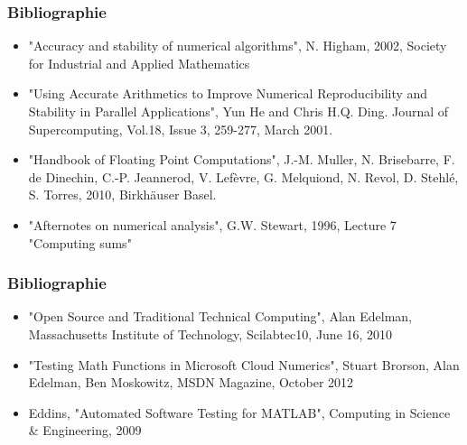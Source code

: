 \documentclass{beamer}
\begin{document}

\begin{frame}
\frametitle{Bibliographie}

\begin{itemize}
\item "Accuracy and stability of numerical algorithms", N. Higham, 2002, 
Society for Industrial and Applied Mathematics
\item "Using Accurate Arithmetics to Improve Numerical 
Reproducibility and Stability in Parallel Applications", 
Yun He and Chris H.Q. Ding. Journal of Supercomputing, 
Vol.18, Issue 3, 259-277, March 2001.
\item "Handbook of Floating Point Computations", 
J.-M. Muller, N. Brisebarre, F. de Dinechin, C.-P. Jeannerod, 
V. Lefèvre, G. Melquiond, N. Revol, D. Stehlé, S. Torres, 2010, 
Birkhäuser Basel.
\item "Afternotes on numerical analysis", G.W. Stewart, 1996, 
Lecture 7 "Computing sums"
\end{itemize}
  
\end{frame}


\begin{frame}
\frametitle{Bibliographie}

\begin{itemize}
\item "Open Source and Traditional Technical Computing", 
Alan Edelman, Massachusetts Institute of Technology, 
Scilabtec10, June 16, 2010
\item "Testing Math Functions in Microsoft Cloud Numerics", 
Stuart Brorson, Alan Edelman, Ben Moskowitz, 
MSDN Magazine, October 2012
\item Eddins, "Automated Software Testing for MATLAB", 
Computing in Science \& Engineering, 2009
\end{itemize}
  
\end{frame}

\end{document}
